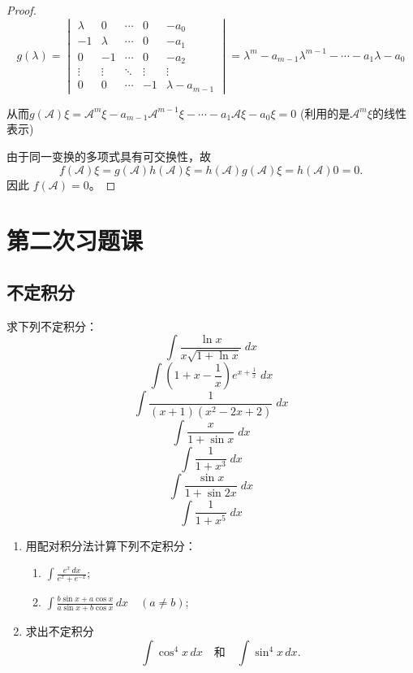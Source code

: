 \documentclass[lang=cn,12pt]{elegantbook}
\begin{document}
\begin{proof}
\[
g(\lambda) = \begin{vmatrix}
\lambda & 0 & \cdots & 0 & -a_0 \\
-1 & \lambda & \cdots & 0 & -a_1 \\
0 & -1 & \cdots & 0 & -a_2 \\
\vdots & \vdots & \ddots & \vdots & \vdots \\
0 & 0 & \cdots & -1 & \lambda-a_{m-1}
\end{vmatrix} = \lambda^m - a_{m-1} \lambda^{m-1} - \cdots - a_1 \lambda - a_0
\]

   从而$g(\mathcal{A}) \xi = \mathcal{A}^m\xi - a_{m-1} \mathcal{A}^{m-1}\xi - \cdots - a_1 \mathcal{A}\xi - a_0 \xi = 0 $ (利用的是$\mathcal{A}^m\xi$的线性表示)

   由于同一变换的多项式具有可交换性，故
\[
f(\mathcal{A}) \xi = g(\mathcal{A}) h(\mathcal{A}) \xi = h(\mathcal{A}) g(\mathcal{A}) \xi  = h(\mathcal{A})0 = 0.
\]
    因此 $f(\mathcal{A}) = 0$。

\end{proof}



\chapter{第二次习题课}

\section{不定积分}

\begin{example}
    求下列不定积分：
    \[
    \int \frac{\ln x}{x\sqrt{1 + \ln x}} \; dx
    \]
    \[
    \int (1 + x - \frac{1}{x})e^{x + \frac{1}{x}} \; dx
    \]
    \[
    \int \frac{1}{(x+1)(x^2 - 2x + 2)} \; dx
    \]
    \[
    \int \frac{x}{1 + \sin x} \; dx
    \]
    \[
    \int \frac{1}{1 + x^3} \; dx
    \]
    \[
    \int \frac{\sin x}{1 + \sin 2x} \; dx
    \]
    \[
    \int \frac{1}{1 + x^5} \; dx
    \]
\end{example}

\begin{example}
    \begin{enumerate}
        \item 用配对积分法计算下列不定积分：
        \begin{enumerate}
            \item \(\displaystyle \int \frac{e^x \, dx}{e^x + e^{-x}}\);
            \item \(\displaystyle \int \frac{b \sin x + a \cos x}{a \sin x + b \cos x} \, dx \quad (a \neq b)\);
        \end{enumerate}
        
        \item 
        求出不定积分
        \[
        \int \cos^4 x \, dx \quad \text{和} \quad \int \sin^4 x \, dx.
        \]
    \end{enumerate}
\end{example}
\end{document}
